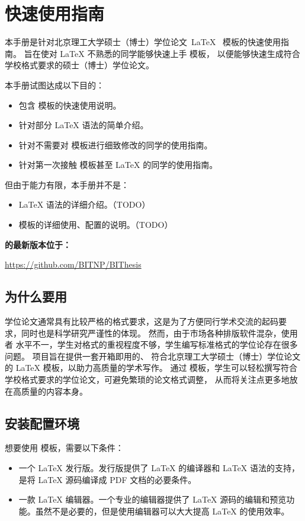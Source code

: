 \chapter{快速使用指南}
\label{chap:what}

本手册是针对北京理工大学硕士（博士）学位论文~\LaTeX~ 模板\BIThesis{}的快速使用指南。
旨在使对 \LaTeX{} 不熟悉的同学能够快速上手 \BIThesis{} 模板，
以便能够快速生成符合学校格式要求的硕士（博士）学位论文。

本手册试图达成以下目的：
\begin{itemize}
  \item 包含 \BIThesis{} 模板的快速使用说明。
  \item 针对部分 \LaTeX{} 语法的简单介绍。
  \item 针对不需要对 \BIThesis{} 模板进行细致修改的同学的使用指南。
  \item 针对第一次接触 \BIThesis{} 模板甚至 \LaTeX{} 的同学的使用指南。
\end{itemize}

但由于能力有限，本手册并不是：
\begin{itemize}
  \item \LaTeX{} 语法的详细介绍。（TODO）
  \item \BIThesis{} 模板的详细使用、配置的说明。（TODO）
\end{itemize}

\textbf{\BIThesis{}的最新版本位于：}
\begin{center}
  \url{https://github.com/BITNP/BIThesis}
\end{center}
\section{为什么要用 \BIThesis{}}

学位论文通常具有比较严格的格式要求，这是为了方便同行学术交流的起码要
求，同时也是科学研究严谨性的体现。
然而，由于市场各种排版软件混杂，使用者
水平不一，学生对格式的重视程度不够，学生编写标准格式的学位论存在很多问题。
\BIThesis{} 项目旨在提供一套开箱即用的、
符合北京理工大学硕士（博士）学位论文的 LaTeX 模板，以助力高质量的学术写作。
通过 \BIThesis{} 模板，学生可以轻松撰写符合学校格式要求的学位论文，可避免繁琐的论文格式调整，
从而将关注点更多地放在高质量的内容本身。

\section{安装配置环境}

想要使用 \BIThesis{} 模板，需要以下条件：
\begin{itemize}
  \item 一个 \LaTeX{} 发行版。发行版提供了 \LaTeX{} 的编译器和 \LaTeX{} 语法的支持，是将 \LaTeX{} 源码编译成 PDF 文档的必要条件。
  \item 一款 \LaTeX{} 编辑器。一个专业的编辑器提供了 \LaTeX{} 源码的编辑和预览功能。虽然不是必要的，但是使用编辑器可以大大提高 \LaTeX{} 的使用效率。
\end{itemize}

